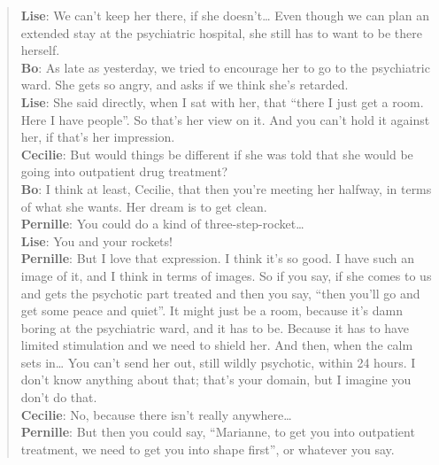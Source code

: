     \blockquote{\textnormal{\bfseries Lise}:	We can’t keep her there, if she doesn’t… Even though we can plan an extended stay at the psychiatric hospital, she still has to want to be there herself.
    \\\textnormal{\bfseries Bo}:	As late as yesterday, we tried to encourage her to go to the psychiatric ward. She gets so angry, and asks if we think she’s retarded.
    \\\textnormal{\bfseries  Lise}: 	She said directly, when I sat with her, that “there I just get a room. Here I have people”. So that’s her view on it. And you can’t hold it against her, if that’s her impression.
    \\\textnormal{\bfseries Cecilie}: 	But would things be different if she was told that she would be going into outpatient drug treatment?
    \\\textnormal{\bfseries Bo}: 	I think at least, Cecilie, that then you’re meeting her halfway, in terms of what she wants. Her dream is to get clean.
    \\\textnormal{\bfseries Pernille}: 	You could do a kind of three-step-rocket…
    \\\textnormal{\bfseries Lise}: 	You and your rockets!
    \\\textnormal{\bfseries Pernille}: 	But I love that expression. I think it’s so good. I have such an image of it, and I think in terms of images. So if you say, if she comes to us and gets the psychotic part treated and then you say, “then you’ll go and get some peace and quiet”. It might just be a room, because it’s damn boring at the psychiatric ward, and it has to be. Because it has to have limited stimulation and we need to shield her. And then, when the calm sets in… You can’t send her out, still wildly psychotic, within 24 hours. I don’t know anything about that; that’s your domain, but I imagine you don’t do that.
    \\\textnormal{\bfseries Cecilie}:	No, because there isn’t really anywhere…
    \\\textnormal{\bfseries Pernille}:	But then you could say, “Marianne, to get you into outpatient treatment, we need to get you into shape first”, or whatever you say.}
